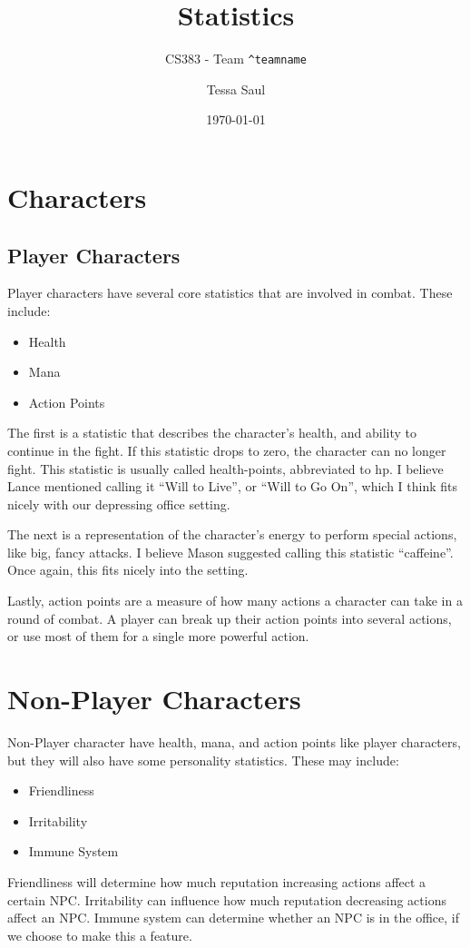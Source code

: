 \documentclass[12pt]{article}
\title{Statistics}
\subtitle{CS383 - Team \texttt{\textasciicircum teamname}}
\date{\today}
\author{
Tessa Saul
}
\begin{document}
\maketitle

\section*{Characters}
\subsection*{Player Characters}
Player characters have several core statistics that are involved in combat. 
These include:
\begin{itemize}
\item Health
\item Mana
\item Action Points 
\end{itemize}
The first is a statistic that describes the character's health, and 
ability to continue in the fight. If this statistic drops to zero, the 
character can no longer fight. This statistic is usually called health-points,
abbreviated to hp. I believe Lance mentioned calling it ``Will to Live'', or 
``Will to Go On'', which I think fits nicely with our depressing office 
setting.

The next is a representation of the character's energy to perform special 
actions, like big, fancy attacks. I believe Mason suggested calling this 
statistic ``caffeine''. Once again, this fits nicely into the setting. 

Lastly, action points are a measure of how many actions a character can take
in a round of combat. A player can break up their action points into several 
actions, or use most of them for a single more powerful action.  

\section*{Non-Player Characters}
Non-Player character have health, mana, and action points like player 
characters, but they will also have some personality statistics. These may
include:
\begin{itemize}
\item Friendliness
\item Irritability 
\item Immune System 
\end{itemize}
Friendliness will determine how much reputation increasing actions affect a
certain NPC. Irritability can influence how much reputation decreasing actions 
affect an NPC. Immune system can determine whether an NPC is in the office, 
if we choose to make this a feature. 
\end{document}
